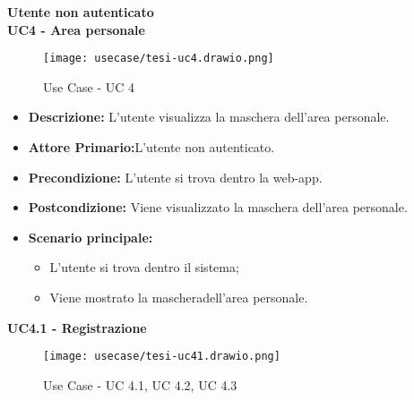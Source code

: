 \textbf{Utente non autenticato}\\
\textbf{UC4 - Area personale}
\begin{figure}[H]
    \centering
    \texttt{[image: usecase/tesi-uc4.drawio.png]}
    \caption{Use Case - UC 4}
\end{figure}
\begin{itemize}
    \item \textbf{Descrizione:} L'utente visualizza la maschera dell'area personale.
    \item \textbf{Attore Primario:}L'utente non autenticato.
    \item \textbf{Precondizione:} L'utente si trova dentro la web-app.
    \item \textbf{Postcondizione:} Viene visualizzato la maschera dell'area personale.
    \item \textbf{Scenario principale:}
    \begin{itemize}
        \item L'utente si trova dentro il sistema;
        \item Viene mostrato la mascheradell'area personale.
    \end{itemize}
\end{itemize}
\textbf{UC4.1 - Registrazione}
\begin{figure}[H]
    \centering
    \texttt{[image: usecase/tesi-uc41.drawio.png]}
    \caption{Use Case - UC 4.1, UC 4.2, UC 4.3}
\end{figure}
